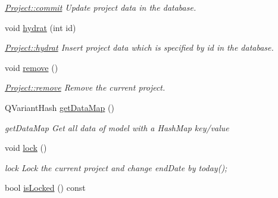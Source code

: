 \begin{DoxyCompactItemize}
\begin{DoxyCompactList}\small\item\em \hyperlink{classModels_1_1Project_afc167f2b5bf9c354826117c5057628ae}{Project\-::commit} Update project data in the database. \end{DoxyCompactList}\item 
void \hyperlink{classModels_1_1Project_aa293709eeb68e4271cac8d4cce418ffa}{hydrat} (int id)
\begin{DoxyCompactList}\small\item\em \hyperlink{classModels_1_1Project_aa293709eeb68e4271cac8d4cce418ffa}{Project\-::hydrat} Insert project data which is specified by {\itshape id} in the database. \end{DoxyCompactList}\item 
\hypertarget{classModels_1_1Project_ab55c71c009ae796e7dbe03017fed67ee}{void \hyperlink{classModels_1_1Project_ab55c71c009ae796e7dbe03017fed67ee}{remove} ()}\label{classModels_1_1Project_ab55c71c009ae796e7dbe03017fed67ee}

\begin{DoxyCompactList}\small\item\em \hyperlink{classModels_1_1Project_ab55c71c009ae796e7dbe03017fed67ee}{Project\-::remove} Remove the current project. \end{DoxyCompactList}\item 
Q\-Variant\-Hash \hyperlink{classModels_1_1Project_a7db5156657a7dbadd024aead14a40182}{get\-Data\-Map} ()
\begin{DoxyCompactList}\small\item\em get\-Data\-Map Get all data of model with a Hash\-Map key/value \end{DoxyCompactList}\item 
\hypertarget{classModels_1_1Project_a6236dccb2ed5a21b353c3379aa8298fd}{void \hyperlink{classModels_1_1Project_a6236dccb2ed5a21b353c3379aa8298fd}{lock} ()}\label{classModels_1_1Project_a6236dccb2ed5a21b353c3379aa8298fd}

\begin{DoxyCompactList}\small\item\em lock Lock the current project and change end\-Date by today(); \end{DoxyCompactList}\item 
\hypertarget{classModels_1_1Project_a5ea39222d1c37ae38ea088921785ecba}{bool \hyperlink{classModels_1_1Project_a5ea39222d1c37ae38ea088921785ecba}{is\-Locked} () const }\label{classModels_1_1Project_a5ea39222d1c37ae38ea088921785ecba}


\end{DoxyCompactItemize}
